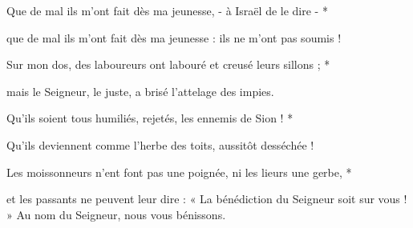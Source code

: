 \item Que de mal ils m'ont fait dès ma jeunesse, - à Israël de le dire - *

\item que de mal ils m'ont fait dès ma jeunesse : ils ne m'ont pas soumis !

\item Sur mon dos, des laboureurs ont labouré et creusé leurs sillons ; *

\item mais le Seigneur, le juste, a brisé l'attelage des impies.

\item Qu'ils soient tous humiliés, rejetés, les ennemis de Sion ! *

\item Qu'ils deviennent comme l'herbe des toits, aussitôt desséchée !

\item Les moissonneurs n'ent font pas une poignée, ni les lieurs une gerbe, *

\item et les passants ne peuvent leur dire : « La bénédiction du Seigneur soit sur vous ! » Au nom du Seigneur, nous vous bénissons.